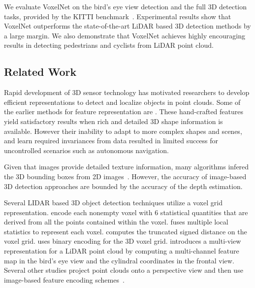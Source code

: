 \documentclass[10pt,twocolumn,letterpaper]{article}
\begin{document}
We evaluate VoxelNet on the bird's eye view detection and the full 3D detection tasks, provided by the KITTI benchmark~\cite{REF:Geiger2012CVPR}. Experimental results show that VoxelNet outperforms  the state-of-the-art LiDAR based 3D detection methods by a large margin. We also demonstrate that VoxelNet achieves highly encouraging results in detecting pedestrians and cyclists from LiDAR point cloud.

\subsection{Related Work}
\label{sec:RelatedWork}



Rapid development of 3D sensor technology has motivated researchers to develop efficient representations to detect and localize objects in point clouds. Some of the earlier methods for feature representation are \cite{REF:StructuralIndexing_Medioni92,REF:COSMOS_Jain97,REF:PointSignatures_Chua1997,REF:SpinImageHebert99,REF:Tuzel2014,REF:FPFH_Beetz2009,REF:RoboticAssembly_Oncel2012,REF:Mian2010,REF:Nishino2010,REF:MS_POSE_Blake2011,REF:bo_iros11}. These hand-crafted features yield satisfactory results when rich and detailed 3D shape information is available. However their inability to adapt to more complex shapes and scenes, and learn required invariances from data resulted in limited success for uncontrolled scenarios such as autonomous navigation. 













Given that images provide detailed texture information, many algorithms infered the 3D bounding boxes from 2D images~\cite{REF:nips15chen,REF:cvpr16chen,REF:xiang_cvpr15,REF:Zia2013,REF:Zia2014,REF:SFM2015}. However, the accuracy of  image-based 3D detection approaches are bounded by the accuracy of the depth estimation. 

Several LIDAR based 3D object detection techniques utilize a voxel grid representation.  \cite{REF:Wang-RSS-15, REF:Vote3Deep} encode each nonempty voxel with 6 statistical quantities that are derived from all the points contained within the voxel. \cite{REF:Song2014} fuses multiple local statistics to represent each voxel. \cite{REF:DeepSlidingShapes} computes the truncated signed distance on the voxel grid. \cite{REF:3DFCN} uses binary encoding for the 3D voxel grid. \cite{REF:cvpr17chen} introduces a multi-view representation for a LiDAR point cloud by computing a multi-channel feature map in the bird's eye view and the cylindral coordinates in the frontal view. Several other studies project point clouds onto a perspective view and then use image-based feature encoding schemes~\cite{REF:FusionDPM-IROS14, REF:MV-RGBD-RF2015,REF:VeloFCN}. 
\end{document}
